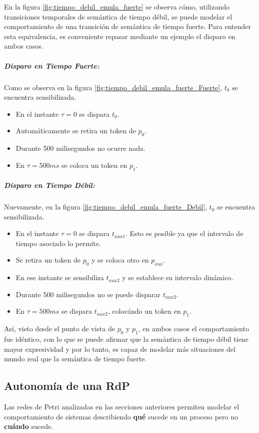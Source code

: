 En la figura \ref{fig:tiempo_debil_emula_fuerte} se observa cómo, utilizando
transiciones temporales de semántica de tiempo débil, se puede modelar el
comportamiento de una transición de semántica de tiempo fuerte.
Para entender esta equivalencia, es conveniente repasar mediante un ejemplo el
disparo en ambos casos.

\subparagraph{Disparo en Tiempo Fuerte:}
Como se observa en la figura \ref{fig:tiempo_debil_emula_fuerte_Fuerte}, $t_{0}$ se
encuentra sensibilizada.
\begin{itemize}
  \item En el instante $\tau = 0$ se dispara $t_{0}$.
  \item Automáticamente se retira un token de $p_{0}$.
  \item Durante 500 milisegundos no ocurre nada.
  \item En $\tau = 500ms$ se coloca un token en $p_{1}$.
\end{itemize}

\subparagraph{Disparo en Tiempo Débil:}
Nuevamente, en la figura \ref{fig:tiempo_debil_emula_fuerte_Debil}, $t_{0}$ se
encuentra sensibilizada.
\begin{itemize}
  \item En el instante $\tau = 0$ se dispara $t_{aux1}$. Esto es posible ya que
  el intervalo de tiempo asociado lo permite.
  \item Se retira un token de $p_{0}$ y se coloca otro en $p_{aux}$.
  \item En ese instante se sensibiliza $t_{aux2}$ y se establece su intervalo dinámico.
  \item Durante 500 milisegundos no se puede disparar $t_{aux2}$.
  \item En $\tau = 500ms$ se dispara $t_{aux2}$, colocándo un token en $p_{1}$.
\end{itemize}

Así, visto desde el punto de vista de $p_{0}$ y $p_{1}$, en ambos casos el
comportamiento fue idéntico, con lo que se puede afirmar que la
semántica de tiempo débil tiene mayor expresividad y por lo tanto, es capaz de
modelar más situaciones del mundo real que la semántica de tiempo fuerte.


\subsection{Autonomía de una RdP}

Las redes de Petri analizadas en las secciones anteriores permiten modelar el
comportamiento de sistemas describiendo \textbf{qué} sucede en un proceso pero
no \textbf{cuándo} sucede.


